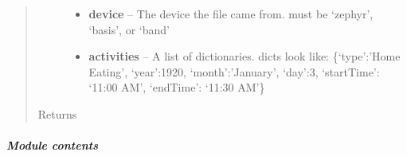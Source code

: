 \documentclass[letterpaper,10pt,english]{sphinxmanual}
\begin{document}
\begin{fulllineitems}
\begin{fulllineitems}
\begin{quote}
\begin{description}
\begin{itemize}
\item {} 
\textbf{device} -- The device the file came from. must be `zephyr', `basis', or `band'

\item {} 
\textbf{activities} -- A list of dictionaries. dicts look like: \{`type':'Home Eating', `year':1920, `month':'January', `day':3, `startTime': `11:00 AM', `endTime': `11:30 AM'\}

\end{itemize}

\item[{Returns}] \leavevmode


\end{description}\end{quote}

\end{fulllineitems}


\begin{fulllineitems}
\label{STD/WebUI:WebUI.WebUI.WebUI.view_data}
\end{fulllineitems}


\begin{fulllineitems}
\label{STD/WebUI:WebUI.WebUI.WebUI.view_experiment}
\end{fulllineitems}


\end{fulllineitems}



\subparagraph{Module contents}
\label{STD/WebUI:module-WebUI}\label{STD/WebUI:module-contents}
\end{document}
